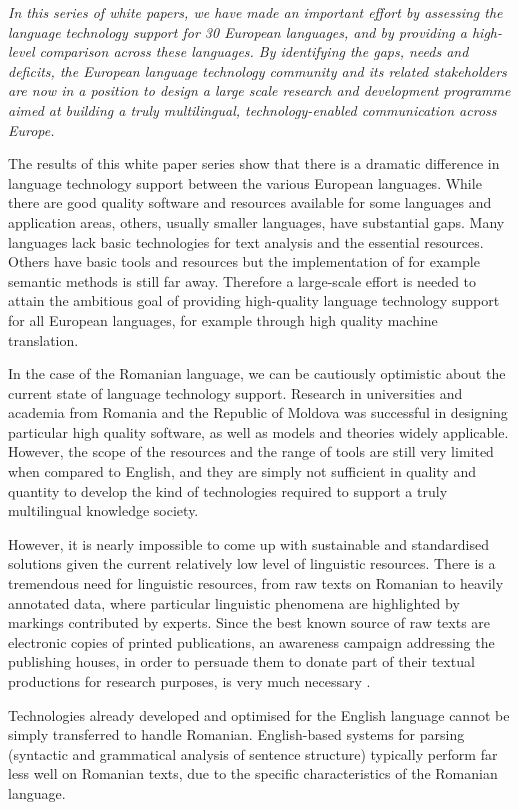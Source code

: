 \begin{multicols}{2}
\emph{In this series of white papers, we have made an important effort by assessing the language technology support for 30 European languages, and by providing a high-level comparison across these languages. By identifying the gaps, needs and deficits, the European language technology community and its related stakeholders are now in a position to design a large scale research and development programme aimed at building a truly multilingual, technology-enabled communication across Europe.}

The results of this white paper series show that there is a dramatic difference in language technology support between the various European languages. While there are good quality software and resources available for some languages and application areas, others, usually smaller languages, have substantial gaps. Many languages lack basic technologies for text analysis and the essential resources. Others have basic tools and resources but the implementation of for example semantic methods is still far away. Therefore a large-scale effort is needed to attain the ambitious goal of providing high-quality language technology support for all European languages, for example through high quality machine translation. 

In the case of the Romanian language, we can be cautiously optimistic about the current state of language technology support. Research in universities and academia from Romania and the Republic of Moldova was successful in designing particular high quality software, as well as models and theories widely applicable. However, the scope of the resources and the range of tools are still very limited when compared to English, and they are simply not sufficient in quality and quantity to develop the kind of technologies required to support a truly multilingual knowledge society.

However, it is nearly impossible to come up with sustainable and standardised solutions given the current relatively low level of linguistic resources. There is a tremendous need for linguistic resources, from raw texts on Romanian to heavily annotated data, where particular linguistic phenomena are highlighted by markings contributed by experts. Since the best known source of raw texts are electronic copies of printed publications, an awareness campaign addressing the publishing houses, in order to persuade them to donate part of their textual productions for research purposes, is very much necessary \cite{cristea4}.

Technologies already developed and optimised for the English language cannot be simply transferred to handle Romanian. English-based systems for parsing (syntactic and grammatical analysis of sentence structure) typically perform far less well on Romanian texts, due to the specific characteristics of the Romanian language.


\end{multicols}
